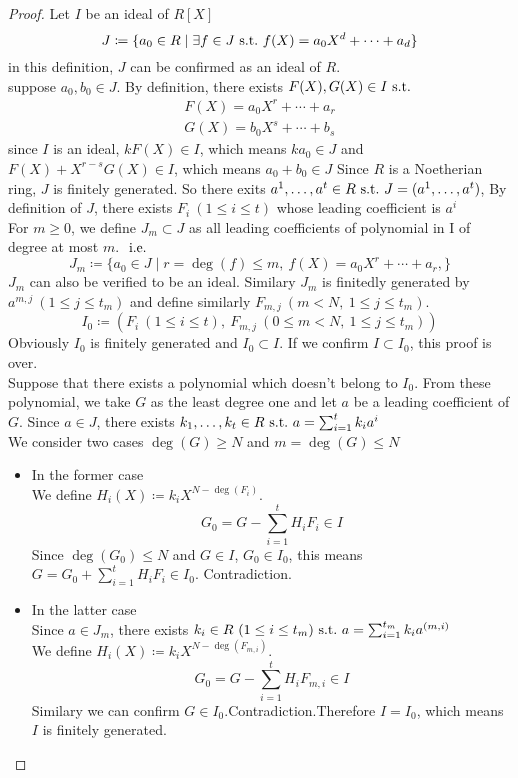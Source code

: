 \documentclass[leqno]{ltjsarticle}
\begin{document}
\begin{proof}
	Let $I$ be an ideal of $R[X]$\\
	\[J\coloneq\{a_0\in R\mid \exists f\in J\ \mathrm{s.t.}\  f(X) = a_0X^d + \cdots + a_d\}\]
	in this definition, $J$ can be confirmed as an ideal of $R$.\\
	\because suppose $a_0 , b_0 \in J$. By definition, there exists $F(X), G(X)\in I \ \mathrm{s.t.}\ $
	\begin{gather*}
		F(X) = a_0X^r + \cdots + a_r\\
		G(X) = b_0X^s + \cdots + b_s
	\end{gather*}
	since $I$ is an ideal, $kF(X) \in I$, which means $ka_0\in J$ and $F(X) + X^{r-s}G(X) \in I$, which means $a_0 + b_0 \in J$
	Since $R$ is a Noetherian ring, $J$ is finitely generated. So there exits $a^1,\ldots, a^t \in R\ \mathrm{s.t.}\  J=(a^1,\ldots, a^t)$, By definition of $J$, there exists $F_i\ (1\le i \le t)$ whose leading coefficient is $a^i$\\
	For $m\ge 0$, we define $J_m\subset J$ as all leading coefficients of polynomial in I of degree at most $m$. $\ \mathrm{i.e.}\ $
	\[J_m \coloneq \{a_0 \in J\mid r= \deg(f) \leq m,\ f(X) = a_0X^r + \cdots + a_r, \}\]
	$J_m$ can also be verified to be an ideal. Similary $J_m$ is finitedly generated by $a^{m,j}\ (1\le j\le t_m)$ and define similarly $F_{m,j}\ (m<N,\ 1\le j\le t_m)$.\\
	\[I_0\coloneq (F_i\ (1\le i \le t),\ F_{m,j}\ (0\le m< N,\ 1\le j\le t_m))\]
	Obviously $I_0$ is finitely generated and $I_0 \subset I$. If we confirm $I\subset I_0$, this proof is over.\\
	Suppose that there exists a polynomial which doesn't belong to $I_0$. From these polynomial, we take $G$ as the least degree one and let $a$ be a leading coefficient of $G$. Since $a\in J$, there exists $k_1,\ldots,k_t\in R\ \mathrm{s.t.}\  a = \sum_{i=1}^{t}k_ia^i$\\
	We consider two cases $\deg(G)\ge N$ and $m = \deg(G)\le N$\\
	\begin{itemize}
		\item In the former case\\
	  We define $H_i(X) \coloneq k_iX^{N-\deg(F_i)}$.
	\[G_0 = G - \sum_{i=1}^{t}H_iF_i\in I\]
	Since $\deg(G_0)\le N$ and $G\in I$, $G_0\in I_0$, this means $G = G_0 + \sum_{i=1}^{t}H_iF_i\in I_0$. Contradiction.\\

	\item In the latter case\\
		Since $a\in J_m$, there exists $k_i\in R\ (1\le i\le t_m)\ \mathrm{s.t.}\  a =\sum_{i=1}^{t_m}k_ia^{(m,i)}$\\
		We define $H_i(X) \coloneq k_iX^{N-\deg(F_{m,i})}$.
		\[G_0 = G - \sum_{i=1}^{t}H_iF_{m,i}\in I\]
	Similary we can confirm $G\in I_0$.Contradiction.Therefore $I=I_0$, which means $I$ is finitely generated.
	\end{itemize}
\end{proof}
\end{document}

